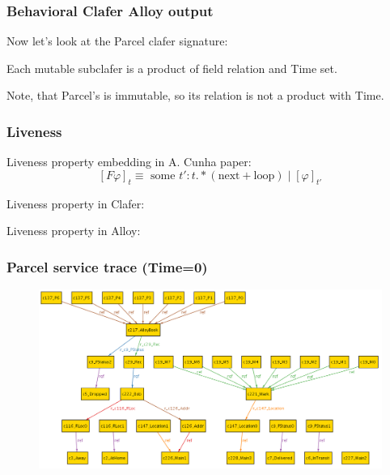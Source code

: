 \documentclass[xcolor=dvipsnames,mathserif,12pt,backend=biber]{beamer}
\begin{document}
  \begin{frame}
    \frametitle{Behavioral Clafer Alloy output}
    Now let's look at the Parcel clafer signature:
    

    Each mutable subclafer is a product of field relation and Time set.
 
    Note, that Parcel's  is immutable, so its relation is not a product with Time.
  \end{frame}
  
  \begin{frame}
    \frametitle{Liveness}
    Liveness property embedding in A. Cunha paper:
    \[
      [F \varphi]_t \equiv \text{ some } t' : t.*(\text{next}+\text{loop} ) \; | \; [\varphi]_{t'}
    \]

    Liveness property in Clafer:
    

    Liveness property in Alloy: 
    
  \end{frame}

  \begin{frame}
    \frametitle{Parcel service trace (Time=0)}
\begin{figure}
\includegraphics[width=1.1 \textwidth]{Figures/Shipping_Time0.png}
\end{figure}
  \end{frame}
\end{document}
